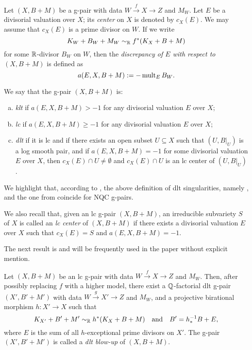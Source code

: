 	\begin{dfn}
		Let $ (X,B+M) $ be a g-pair with data $ W \overset{f}{\longrightarrow} X \to Z $ and $ M_W $. Let $ E $ be a divisorial valuation over $ X $; its \emph{center} on $ X $ is denoted by $ c_X(E) $. We may assume that $ c_X(E) $ is a prime divisor on $ W $. If we write 
		\[ K_W + B_W + M_W \sim_{\mathbb{R}} f^* ( K_X + B + M ) \]
		for some $ \mathbb{R} $-divisor $ B_W $ on $ W $, then the \emph{discrepancy of $ E $ with respect to $ (X,B+M) $} is defined as
		\[ a(E, X, B+M) :=-\operatorname{mult}_E B_W . \]
		
		We say that the g-pair $ (X,B+M) $ is:
		\begin{enumerate}[(a)]
			\item \emph{klt} if $  a(E,X,B+M) > -1 $ for any divisorial valuation $ E $ over $ X $;
			
			\item \emph{lc} if $  a(E,X,B+M) \geq -1 $ for any divisorial valuation $ E $ over $ X $;
			
			\item \emph{dlt} if it is lc and if there exists an open subset $U \subseteq X$ such that $(U,B|_U)$ is a log smooth pair, and if $ a(E,X,B+M) = -1 $ for some divisorial valuation $ E $ over $X$, then $ c_X(E) \cap U \neq \emptyset $ and $ c_X(E) \cap U $ is an lc center of $(U,B|_U)$.
		\end{enumerate}
	\end{dfn}
	
	We highlight that, according to \cite[Theorem 6.1]{Hash22a}, the above definition of dlt singularities, namely \cite[Definition 2.3]{HanLi22}, and the one from \cite[Subsection 2.13(2)]{Bir19} coincide for NQC g-pairs.
	
	\medskip
	
	We also recall that, given an  lc g-pair $ (X,B+M) $, an irreducible subvariety $ S $ of $ X $ is called an \emph{lc center} of $ (X,B+M) $ if there exists a divisorial valuation $ E $ over $ X $ such that $  c_X(E) = S $ and $ a(E,X,B + M) = -1 $.
	
	\medskip
	
	The next result is \cite[Proposition 3.10]{HanLi22} and will be frequently used in the paper without explicit mention.
	
	\begin{lem}
		Let $ (X,B+M) $ be an lc g-pair with data $ W \overset{f}{\to} X \to Z $ and $ M_W $. Then, after possibly replacing $ f $ with a higher model, there exist a $\mathbb{Q}$-factorial dlt g-pair $(X',B'+M')$ with data $ W \overset{g}{\to} X' \to Z $ and $ M_W $, and a projective birational morphism $ h \colon X' \to X $ such that 
		\[ K_{X'} + B' + M' \sim_{\mathbb{R}} h^* (K_X + B + M) \quad \text{and} \quad B' = h_*^{-1} B + E , \]
		where $ E $ is the sum of all $ h $-exceptional prime divisors on $ X' $. The g-pair $(X',B'+M')$ is called a \emph{dlt blow-up} of $(X,B+M)$.
	\end{lem}
	
